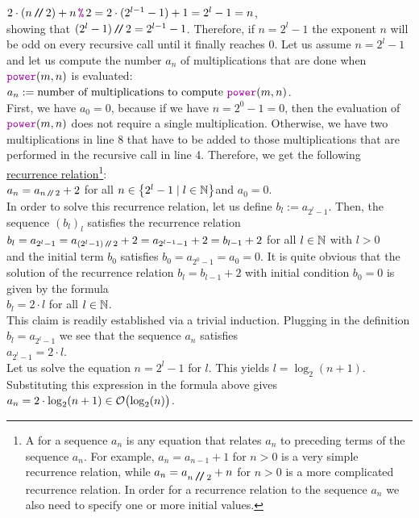 $2 \cdot(n \dv 2) + n \,\mytt{\symbol{37}}\, 2 = 2 \cdot (2^{l-1} - 1) + 1 = 2^l - 1 = n$,
\\[0.2cm]
showing that $(2^l -1 ) \mbox{\,\texttt{/}$\!$\texttt{/}\,} 2 = 2^{l-1} -1$.
Therefore, if $n = 2^l - 1$ the exponent $n$ will be odd on every recursive call until it finally reaches $0$.
Let us assume $n = 2^l - 1$ and let us compute the number $a_n$ of multiplications that
are done when $\mytt{power}(m,n)$ is evaluated:
\\[0.2cm]
\hspace*{1.3cm}
$a_n := \mbox{number of multiplications to compute \mytt{power}}(m, n)$.
\\[0.2cm]
First, we have $a_0 = 0$, because if we have $n = 2^0 - 1 = 0$, then the evaluation of 
$\mytt{power}(m, n)$ does not require a single multiplication.
Otherwise, we have two multiplications in line 8 that have to be added to those multiplications
that are performed in the recursive call in line 4.  Therefore, we get the following
\href{http://en.wikipedia.org/wiki/Recurrence_relation}{recurrence relation}\footnote{
  A   for a sequence $a_n$ is any equation that relates
  $a_n$ to preceding terms of the sequence $a_n$.  For example, $a_n = a_{n-1} + 1$ for $n > 0$ is a very
  simple recurrence relation, while $a_n = a_{n \mbox{\,\texttt{/}$\!$\texttt{/}\,} 2} + n$ for $n > 0$ is a more complicated recurrence
  relation.  In order for a recurrence relation to  the sequence $a_n$ we also need to specify one
  or more initial values.  
}:
\\[0.2cm]
\hspace*{1.3cm}
$a_n = a_{n \mbox{\scriptsize\,\texttt{/}$\!$\texttt{/}\,} 2} + 2$ \qquad for all $n \in \left\{2^l - 1 \mid l \in {\mathbb N}\right\}$\quad and $a_0 = 0$. 
\\[0.2cm]
In order to solve this recurrence relation, let us define $b_l := a_{2^l-1}$.  Then, the sequence
$(b_l)_l$ 
satisfies the recurrence relation
 \\[0.2cm]
\hspace*{1.3cm} 
$b_l = a_{2^l-1} = a_{(2^l-1) \mbox{\scriptsize\,\texttt{/}$\!$\texttt{/}\,} 2} + 2 = a_{2^{l-1}-1} + 2 = b_{l-1} +2$ \qquad for all $l\in{\mathbb N}$ with
$l > 0$
\\[0.2cm]
and the initial term $b_0$ satisfies $b_0 = a_{2^0-1} = a_0 = 0$.  It is quite obvious that the
solution of the recurrence relation $b_l = b_{l-1} + 2$ with initial condition $b_0 = 0$ is given by the formula
\\[0.2cm]
\hspace*{1.3cm} $b_l = 2 \cdot l$ \qquad for all $l \in {\mathbb N}$. 
\\[0.2cm] 
This claim is readily established via a trivial induction.  Plugging in the definition $b_l = a_{2^l-1}$ we
see that the sequence $a_n$ satisfies \\[0.2cm]
\hspace*{1.3cm} $a_{2^l-1} = 2 \cdot l$. 
\\[0.2cm]
Let us solve the equation $n = 2^l - 1$ for $l$.  This yields
 $l =
\log_2(n+1)$.  Substituting this expression in the formula above gives \\[0.2cm]
\hspace*{1.3cm} $a_n = 2 \cdot \log_2(n+1) \in \mathcal{O}\bigl(\log_2(n)\bigr)$.
\vspace*{0.3cm}

